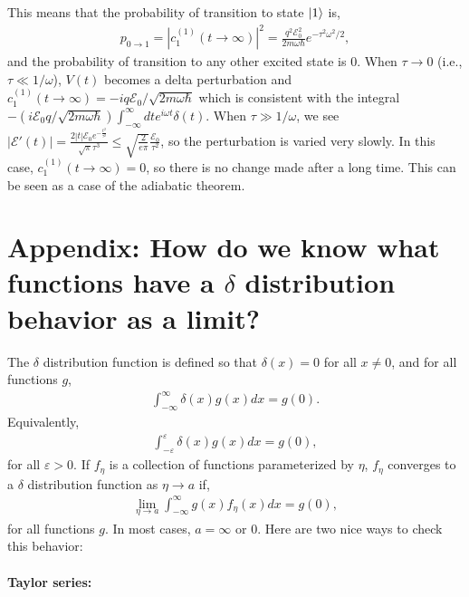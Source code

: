 \documentclass[10pt]{article}
\newcommand{\1}{\mathbf 1}
\begin{document}
This means that the probability of transition to state $\ket{1}$ is,
\begin{align}
	p_{0 \to 1} =
	|c_1^{(1)}(t \to \infty)|^2 
	=
	\frac{q^2\mathcal{E}_0^2}{2 m \omega \hbar}
	e^{-\tau^2 \omega^2/2},
\end{align}
and the probability of transition to any other excited state is $0$.
When $\tau \to 0$ (i.e., $\tau \ll 1/\omega$), $V(t)$ becomes a delta perturbation and $c_1^{(1)}(t \to \infty)
=
-iq\mathcal{E}_0/\sqrt{2m \omega \hbar}$ which is consistent with the integral $-(i \mathcal{E}_0q/\sqrt{2m \omega \hbar}) \int_{-\infty}^\infty 
dt
e^{i\omega t}
\delta(t).
$
When $\tau \gg 1/\omega$, we see $|\mathcal{E}'(t)| = \frac{2 |t| \mathcal{E}_0 e^{-\frac{t^2}{\tau ^2}}}{\sqrt{\pi } \tau ^3}
\leq
\sqrt{\frac{2}{e \pi }}\frac{ \mathcal{E}_0}{\tau ^2}
$,
so the perturbation is varied very slowly.
In this case, $c_1^{(1)}(t \to \infty) = 0$, so there is no change made after a long time.
This can be seen as a case of the adiabatic theorem.

\section*{Appendix: How do we know what functions have a $\delta$ distribution behavior as a limit?}

The $\delta$ distribution function is defined so that $\delta(x) = 0$ for all $x \ne 0$, and for all functions $g$,
\begin{align}
	\int_{-\infty}^\infty \delta(x) g(x) dx = g(0).
\end{align}
Equivalently,
\begin{align}
	\int_{-\varepsilon}^{\varepsilon} \delta(x) g(x) dx = g(0),
\end{align}
for all $\varepsilon > 0$.
If $f_\eta$ is a collection of functions parameterized by $\eta$, $f_\eta$ converges to a $\delta$ distribution function as $\eta \to a$ if,
\begin{align}
	\lim_{\eta \to a}
	\int_{-\infty}^\infty g(x) f_\eta(x) dx
	=
	g(0),
\end{align}
for all functions $g$.
In most cases, $a = \infty$ or $0$.
Here are two nice ways to check this behavior:

\paragraph{Taylor series:}
\end{document}
